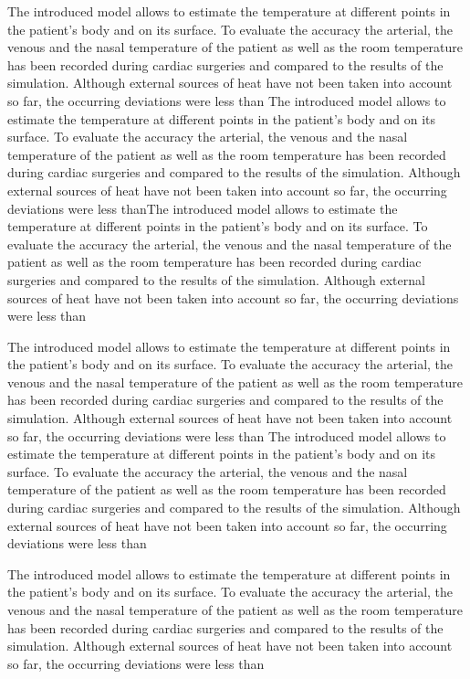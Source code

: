 The introduced model allows to estimate the temperature at different points in the patient's body and on its surface. To evaluate the accuracy the arterial, the venous and the nasal temperature of the patient as well as the room temperature has been recorded during cardiac surgeries and compared to the results of the simulation. Although external sources of heat have not been taken into account so far, the occurring deviations were less than The introduced model allows to estimate the
temperature at different points in the patient's body and on its surface. To evaluate the accuracy the arterial, the venous and the nasal temperature of the patient as well as the room temperature has been recorded during cardiac surgeries and compared to the results of the simulation. Although external sources of heat have not been taken into account so far, the occurring deviations were less thanThe introduced model allows to estimate the temperature at different points in the patient's body and on its surface. To evaluate the accuracy the arterial, the venous and the nasal temperature of the patient as well as the room temperature has been recorded during cardiac surgeries and compared to the results of the simulation. Although external sources of heat have not been taken into account so far, the occurring deviations were less than



The introduced model allows to estimate the temperature at different points in the patient's body and on its surface. To evaluate the accuracy the arterial, the venous and the nasal temperature of the patient as well as the room temperature has been recorded during cardiac surgeries and compared to the results of the simulation. Although external sources of heat have not been taken into account so far, the occurring deviations were less than The introduced model allows to estimate the temperature at different points in the patient's body and on its surface. To evaluate the accuracy the arterial, the venous and the nasal temperature of the patient as well as the room temperature has been recorded during cardiac surgeries and compared to the results of the simulation. Although external sources of heat have not been taken into account so far, the occurring deviations were less than

The introduced model allows to estimate the temperature at different points in the patient's body and on its surface. To evaluate the accuracy the arterial, the venous and the nasal temperature of the patient as well as the room temperature has been recorded during cardiac surgeries and compared to the results of the simulation. Although external sources of heat have not been taken into account so far, the occurring deviations were less than\cite{trees:68}
